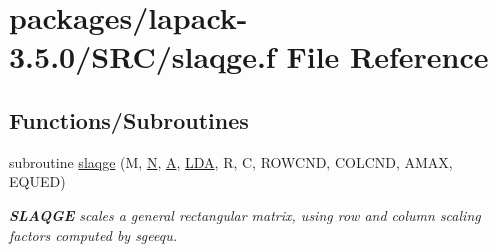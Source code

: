 \hypertarget{slaqge_8f}{}\section{packages/lapack-\/3.5.0/\+S\+R\+C/slaqge.f File Reference}
\label{slaqge_8f}
\subsection*{Functions/\+Subroutines}
\begin{DoxyCompactItemize}
\item 
subroutine \hyperlink{group__realGEauxiliary_gabaa3db78f4dbf32f2513725d6ec253b5}{slaqge} (M, \hyperlink{polmisc_8c_a0240ac851181b84ac374872dc5434ee4}{N}, \hyperlink{classA}{A}, \hyperlink{example__user_8c_ae946da542ce0db94dced19b2ecefd1aa}{L\+D\+A}, R, C, R\+O\+W\+C\+N\+D, C\+O\+L\+C\+N\+D, A\+M\+A\+X, E\+Q\+U\+E\+D)
\begin{DoxyCompactList}\small\item\em {\bfseries S\+L\+A\+Q\+G\+E} scales a general rectangular matrix, using row and column scaling factors computed by sgeequ. \end{DoxyCompactList}\end{DoxyCompactItemize}
